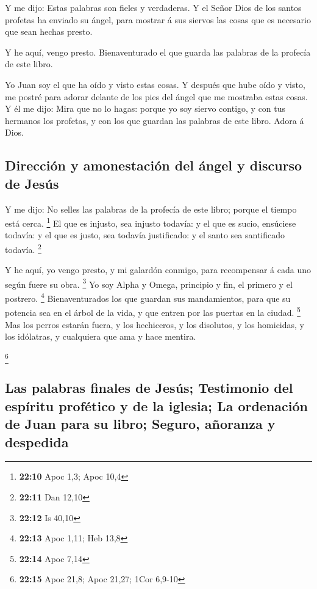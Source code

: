  Y me dijo: Estas palabras son fieles y verdaderas. Y el
Señor Dios de los santos profetas ha enviado su ángel, para mostrar á
sus siervos las cosas que es necesario que sean hechas presto.

 Y he aquí, vengo presto. Bienaventurado el que guarda las
palabras de la profecía de este libro.

 Yo Juan soy el que ha oído y visto estas cosas. Y después
que hube oído y visto, me postré para adorar delante de los pies del
ángel que me mostraba estas cosas.  Y él me dijo: Mira que
no lo hagas: porque yo soy siervo contigo, y con tus hermanos los
profetas, y con los que guardan las palabras de este libro. Adora á
Dios.

\hypertarget{direcciuxf3n-y-amonestaciuxf3n-del-uxe1ngel-y-discurso-de-jesuxfas}{%
\subsection{Dirección y amonestación del ángel y discurso de
Jesús}\label{direcciuxf3n-y-amonestaciuxf3n-del-uxe1ngel-y-discurso-de-jesuxfas}}

 Y me dijo: No selles las palabras de la profecía de este
libro; porque el tiempo está cerca. \footnote{\textbf{22:10} Apoc 1,3;
  Apoc 10,4}  El que es injusto, sea injusto todavía: y
el que es sucio, ensúciese todavía: y el que es justo, sea todavía
justificado: y el santo sea santificado todavía. \footnote{\textbf{22:11}
  Dan 12,10}

 Y he aquí, yo vengo presto, y mi galardón conmigo, para
recompensar á cada uno según fuere su obra. \footnote{\textbf{22:12} Is
  40,10}  Yo soy Alpha y Omega, principio y fin, el
primero y el postrero. \footnote{\textbf{22:13} Apoc 1,11; Heb 13,8}
 Bienaventurados los que guardan sus mandamientos, para
que su potencia sea en el árbol de la vida, y que entren por las puertas
en la ciudad. \footnote{\textbf{22:14} Apoc 7,14}  Mas
los perros estarán fuera, y los hechiceros, y los disolutos, y los
homicidas, y los idólatras, y cualquiera que ama y hace mentira.

\footnote{\textbf{22:15} Apoc 21,8; Apoc 21,27; 1Cor 6,9-10}

\hypertarget{las-palabras-finales-de-jesuxfas-testimonio-del-espuxedritu-profuxe9tico-y-de-la-iglesia-la-ordenaciuxf3n-de-juan-para-su-libro-seguro-auxf1oranza-y-despedida}{%
\subsection{Las palabras finales de Jesús; Testimonio del espíritu
profético y de la iglesia; La ordenación de Juan para su libro; Seguro,
añoranza y
despedida}\label{las-palabras-finales-de-jesuxfas-testimonio-del-espuxedritu-profuxe9tico-y-de-la-iglesia-la-ordenaciuxf3n-de-juan-para-su-libro-seguro-auxf1oranza-y-despedida}}

